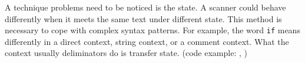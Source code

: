 A technique problems need to be noticed is the state. A scanner could
behave differently when it meets the same text under different
state. This method is necessary to cope with complex syntax patterns.
For example, the word \verb+if+ means differently in a direct context,
string context, or a comment context. What the context usually
deliminators do is transfer state. (code example:
,
)






